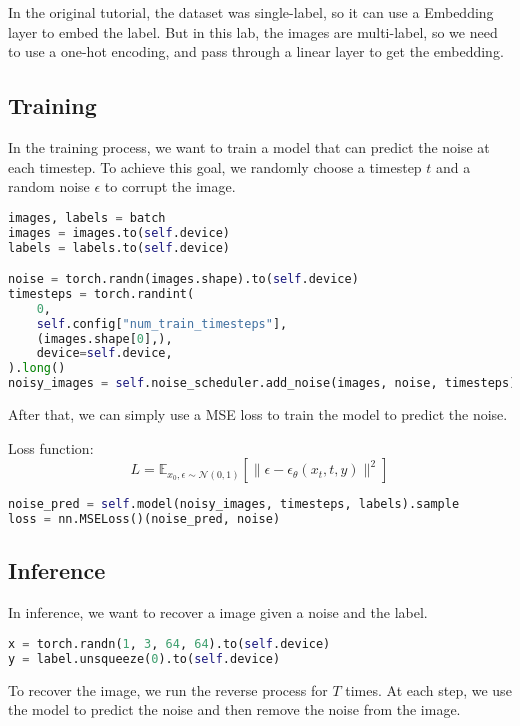 In the original tutorial, the dataset was single-label, so it can use a Embedding layer to embed the label.
But in this lab, the images are multi-label, so we need to use a one-hot encoding, and pass through a linear layer to get the embedding.

\subsection{Training}
In the training process, we want to train a model that can predict the noise at each timestep.
To achieve this goal, we randomly choose a timestep $t$ and a random noise $\epsilon$ to corrupt the image.

\begin{lstlisting}[language=Python]
images, labels = batch
images = images.to(self.device)
labels = labels.to(self.device)

noise = torch.randn(images.shape).to(self.device)
timesteps = torch.randint(
    0,
    self.config["num_train_timesteps"],
    (images.shape[0],),
    device=self.device,
).long()
noisy_images = self.noise_scheduler.add_noise(images, noise, timesteps)
\end{lstlisting}

After that, we can simply use a MSE loss to train the model to predict the noise.

Loss function:
\begin{equation}
    L = \mathbb{E}_{x_0, \epsilon \sim \mathcal{N}(0, 1)} [\| \epsilon - \epsilon_\theta(x_t, t, y) \|^2]
\end{equation}

\begin{lstlisting}[language=Python]
noise_pred = self.model(noisy_images, timesteps, labels).sample
loss = nn.MSELoss()(noise_pred, noise)
\end{lstlisting}

\subsection{Inference}
In inference, we want to recover a image given a noise and the label.

\begin{lstlisting}[language=Python]
x = torch.randn(1, 3, 64, 64).to(self.device)
y = label.unsqueeze(0).to(self.device)
\end{lstlisting}

To recover the image, we run the reverse process for $T$ times.
At each step, we use the model to predict the noise and then remove the noise from the image.

